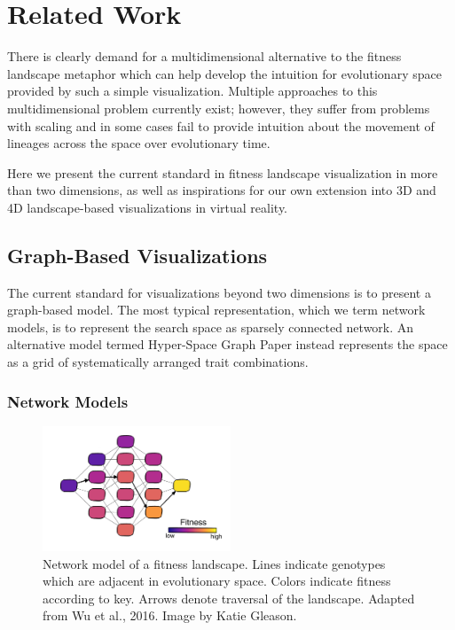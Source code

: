\section{Related Work}

There is clearly demand for a multidimensional alternative to the fitness landscape metaphor which can help develop the intuition for evolutionary space provided by such a simple visualization. Multiple approaches to this multidimensional problem currently exist; however, they suffer from problems with scaling  and in some cases fail to provide intuition about the movement of lineages across the space over evolutionary time.

Here we present the current standard in fitness landscape visualization in more than two dimensions, as well as inspirations for our own extension into 3D and 4D landscape-based visualizations in virtual reality. 

\subsection{Graph-Based Visualizations}

The current standard for visualizations beyond two dimensions is to present a graph-based model. 
The most typical representation, which we term network models, is to represent the search space as sparsely connected network.
An alternative model termed Hyper-Space Graph Paper instead represents the space as a grid of systematically arranged trait combinations.

\subsubsection{Network Models}

\begin{figure}
    \centering
    \includegraphics[width=0.5\textwidth]{chapters/3-vr-viz/figs/network.png}
    \caption{Network model of a fitness landscape. Lines indicate genotypes which are adjacent in evolutionary space. Colors indicate fitness according to key. Arrows denote traversal of the landscape. Adapted from Wu et al., 2016. Image by Katie Gleason.}
    \label{fig:related-work:network}
\end{figure}


